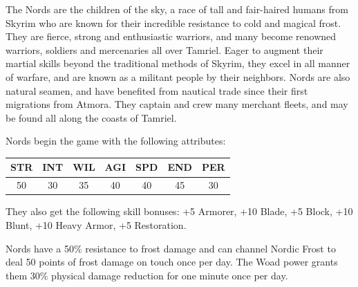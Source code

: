\documentclass[12pt]{book}
\begin{document}
The Nords are the children of the sky, a race of tall and fair-haired humans from Skyrim who are known for their incredible resistance to cold and magical frost. They are fierce, strong and enthusiastic warriors, and many become renowned warriors, soldiers and mercenaries all over Tamriel. Eager to augment their martial skills beyond the traditional methods of Skyrim, they excel in all manner of warfare, and are known as a militant people by their neighbors. Nords are also natural seamen, and have benefited from nautical trade since their first migrations from Atmora. They captain and crew many merchant fleets, and may be found all along the coasts of Tamriel.

Nords begin the game with the following attributes:
\begin{center}
\begin{tabular}{|c|c|c|c|c|c|c|}
\hline
STR & INT & WIL & AGI & SPD & END & PER\\ \hline
50 & 30 & 35 & 40 & 40 & 45 & 30\\ \hline
\end{tabular}
\end{center}

They also get the following skill bonuses: +5 Armorer, +10 Blade, +5 Block, +10 Blunt, +10 Heavy Armor, +5 Restoration.

Nords have a 50\% resistance to frost damage and can channel Nordic Frost to deal 50 points of frost damage on touch once per day. The Woad power grants them 30\% physical damage reduction for one minute once per day.\\
\end{document}
